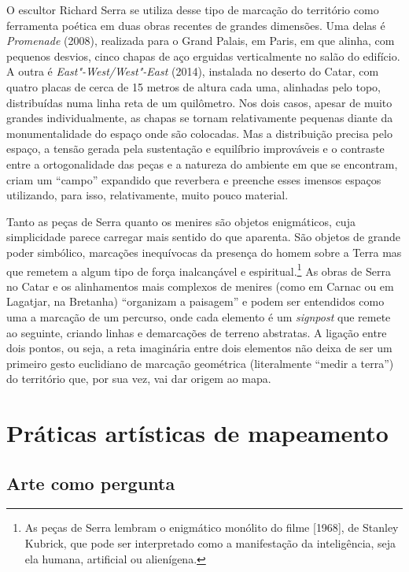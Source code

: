 O escultor Richard Serra se utiliza desse tipo de marcação do território
como ferramenta poética em duas obras recentes de grandes dimensões. Uma
delas é \emph{Promenade} (2008), realizada para o Grand Palais, em
Paris, em que alinha, com pequenos desvios, cinco chapas de aço erguidas
verticalmente no salão do edifício. A outra é \emph{East"-West/West"-East}
(2014), instalada no deserto do Catar, com quatro placas de cerca de 15
metros de altura cada uma, alinhadas pelo topo, distribuídas numa linha
reta de um quilômetro. Nos dois casos, apesar de muito grandes
individualmente, as chapas se tornam relativamente pequenas diante da
monumentalidade do espaço onde são colocadas. Mas a distribuição precisa
pelo espaço, a tensão gerada pela sustentação e equilíbrio improváveis e
o contraste entre a ortogonalidade das peças e a natureza do ambiente em
que se encontram, criam um ``campo'' expandido que reverbera e preenche
esses imensos espaços utilizando, para isso, relativamente, muito pouco
material.

Tanto as peças de Serra quanto os menires são objetos enigmáticos, cuja
simplicidade parece carregar mais sentido do que aparenta. São objetos
de grande poder simbólico, marcações inequívocas da presença do homem
sobre a Terra mas que remetem a algum tipo de força inalcançável e
espiritual.\footnote{As peças de Serra lembram o enigmático monólito do
  filme {} {[}1968{]}, de Stanley
  Kubrick, que pode ser interpretado como a manifestação da
  inteligência, seja ela humana, artificial ou alienígena.} As obras de
Serra no Catar e os alinhamentos mais complexos de menires (como em
Carnac ou em Lagatjar, na Bretanha) ``organizam a paisagem'' e podem ser
entendidos como uma a marcação de um percurso, onde cada elemento é um
\emph{signpost} que remete ao seguinte, criando linhas e demarcações de
terreno abstratas. A ligação entre dois pontos, ou seja, a reta
imaginária entre dois elementos não deixa de ser um primeiro gesto
euclidiano de marcação geométrica (literalmente ``medir a terra'') do
território que, por sua vez, vai dar origem ao mapa.


\part{Práticas artísticas de mapeamento}
\removeepigraph

\chapter{Arte como pergunta}

